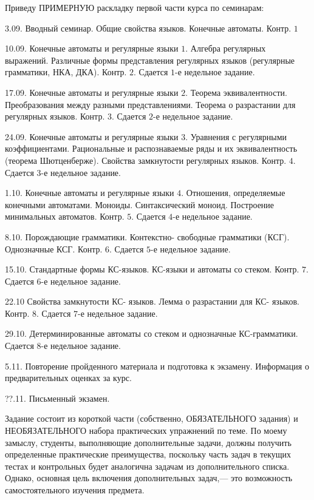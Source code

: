 \documentclass[10pt,twocolumn]{article}
\begin{document}
{Приведу ПРИМЕРНУЮ раскладку первой части курса по семинарам:

3.09. Вводный семинар.
Общие свойства языков. 
Конечные автоматы. 
Контр. $1$

10.09. Конечные автоматы и регулярные языки $1$.
Алгебра регулярных выражений.
Различные формы представления регулярных языков (регулярные грамматики, НКА, ДКА). 
Контр. $2$.  Сдается $1$-е недельное задание.


17.09. Конечные автоматы и регулярные языки $2$.
Теорема эквивалентности.
Преобразования между
разными представлениями.
Теорема о разрастании для
регулярных языков.
Контр.
$3$.  Сдается $2$-е недельное задание.

24.09. Конечные автоматы и регулярные языки $3$.
 Уравнения с регулярными коэффициентами. 
Рациональные и распознаваемые ряды и их эквивалентность (теорема 
Шютценберже).
Свойства замкнутости регулярных языков. 
 Контр. $4$.  Сдается $3$-е недельное задание.


1.10. Конечные автоматы и регулярные языки $4$.
Отношения, определяемые конечными автоматами. Моноиды.  Синтаксический моноид. Построение минимальных
автоматов. Контр. $5$.  Сдается $4$-е недельное задание.



8.10.  
Порождающие грамматики. Контекстно- свободные грамматики (КСГ).
Однозначные КСГ.
Контр. $6$.
Сдается $5$-е недельное задание.


15.10. Стандартные формы КС-языков. КС-языки и  автоматы со стеком.
Контр. $7$.
Сдается $6$-е недельное задание.

22.10 Свойства замкнутости КС- языков. Лемма о разрастании для КС-
языков. 
Контр. $8$.
Сдается $7$-е недельное задание.

29.10. Детерминированные  автоматы со стеком и однозначные КС-грамматики.
Сдается $8$-е недельное задание.

5.11. Повторение пройденного материала и подготовка к экзамену.
Информация о предварительных оценках за курс.

??.11. Письменный экзамен.


\smallskip

Задание состоит из короткой части (собственно, ОБЯЗАТЕЛЬНОГО задания) и 
НЕОБЯЗАТЕЛЬНОГО набора практических упражнений по теме. По моему замыслу, студенты, 
выполняющие дополнительные задачи, должны получить определенные практические
преимущества, поскольку часть задач в текущих тестах и контрольных будет
аналогична задачам из дополнительного списка. Однако, основная цель включения
дополнительных задач,--- это возможность самостоятельного изучения предмета.

}
\end{document}
